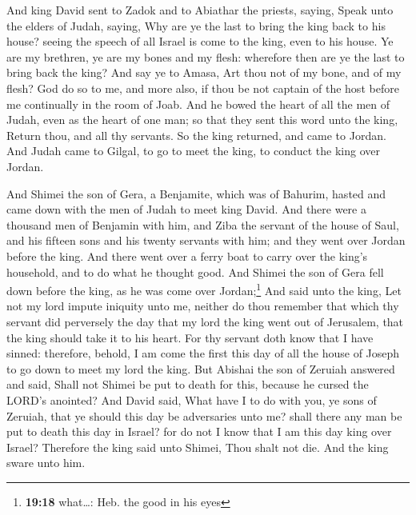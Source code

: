  And king David sent to Zadok and to Abiathar the
priests, saying, Speak unto the elders of Judah, saying, Why are ye the
last to bring the king back to his house? seeing the speech of all
Israel is come to the king, even to his house.  Ye are my
brethren, ye are my bones and my flesh: wherefore then are ye the last
to bring back the king?  And say ye to Amasa, Art thou
not of my bone, and of my flesh? God do so to me, and more also, if thou
be not captain of the host before me continually in the room of Joab.
 And he bowed the heart of all the men of Judah, even as
the heart of one man; so that they sent this word unto the king, Return
thou, and all thy servants.  So the king returned, and
came to Jordan. And Judah came to Gilgal, to go to meet the king, to
conduct the king over Jordan.

 And Shimei the son of Gera, a Benjamite, which was of
Bahurim, hasted and came down with the men of Judah to meet king David.
 And there were a thousand men of Benjamin with him, and
Ziba the servant of the house of Saul, and his fifteen sons and his
twenty servants with him; and they went over Jordan before the king.
 And there went over a ferry boat to carry over the
king's household, and to do what he thought good. And Shimei the son of
Gera fell down before the king, as he was come over Jordan;\footnote{\textbf{19:18}
  what\ldots: Heb. the good in his eyes}  And said unto
the king, Let not my lord impute iniquity unto me, neither do thou
remember that which thy servant did perversely the day that my lord the
king went out of Jerusalem, that the king should take it to his heart.
 For thy servant doth know that I have sinned: therefore,
behold, I am come the first this day of all the house of Joseph to go
down to meet my lord the king.  But Abishai the son of
Zeruiah answered and said, Shall not Shimei be put to death for this,
because he cursed the LORD's anointed?  And David said,
What have I to do with you, ye sons of Zeruiah, that ye should this day
be adversaries unto me? shall there any man be put to death this day in
Israel? for do not I know that I am this day king over Israel?
 Therefore the king said unto Shimei, Thou shalt not die.
And the king sware unto him.

